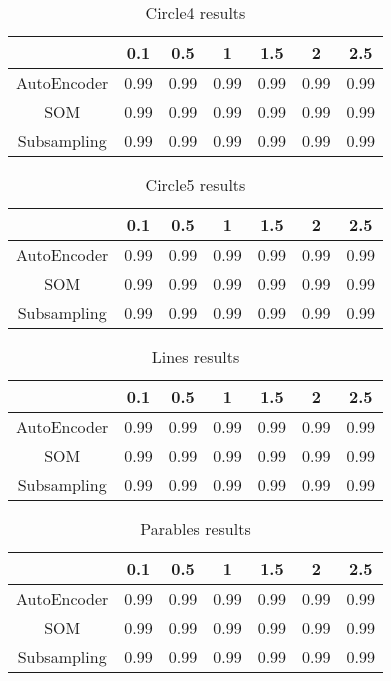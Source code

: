 \begin{table}[h]
    \centering
    \def\arraystretch{1.5}
    \begin{tabular}{|| c | c | c | c | c | c | c ||}
    \hline
         & 0.1 & 0.5 & 1 & 1.5 & 2 & 2.5  \\
    \hline \hline
    AutoEncoder & 0.99 & 0.99 & 0.99 & 0.99 & 0.99 & 0.99 \\ \hline
    SOM & 0.99 & 0.99 & 0.99 & 0.99 & 0.99 & 0.99 \\ \hline
    Subsampling & 0.99 & 0.99 & 0.99 & 0.99 & 0.99 & 0.99 \\ \hline
    \end{tabular}
    \caption{Circle4 results}
    \label{tab:circle4_res}
\end{table}

\begin{table}[h]
    \centering
    \def\arraystretch{1.5}
    \begin{tabular}{|| c | c | c | c | c | c | c ||}
    \hline
         & 0.1 & 0.5 & 1 & 1.5 & 2 & 2.5  \\
    \hline \hline
    AutoEncoder & 0.99 & 0.99 & 0.99 & 0.99 & 0.99 & 0.99 \\ \hline
    SOM & 0.99 & 0.99 & 0.99 & 0.99 & 0.99 & 0.99 \\ \hline
    Subsampling & 0.99 & 0.99 & 0.99 & 0.99 & 0.99 & 0.99 \\ \hline
    \end{tabular}
    \caption{Circle5 results}
    \label{tab:circle5_res}
\end{table}

\begin{table}[h]
    \centering
    \def\arraystretch{1.5}
    \begin{tabular}{|| c | c | c | c | c | c | c ||}
    \hline
         & 0.1 & 0.5 & 1 & 1.5 & 2 & 2.5  \\
    \hline \hline
    AutoEncoder & 0.99 & 0.99 & 0.99 & 0.99 & 0.99 & 0.99 \\ \hline
    SOM & 0.99 & 0.99 & 0.99 & 0.99 & 0.99 & 0.99 \\ \hline
    Subsampling & 0.99 & 0.99 & 0.99 & 0.99 & 0.99 & 0.99 \\ \hline
    \end{tabular}
    \caption{Lines results}
    \label{tab:lines_res}
\end{table}

\begin{table}[h]
    \centering
    \def\arraystretch{1.5}
    \begin{tabular}{|| c | c | c | c | c | c | c ||}
    \hline
         & 0.1 & 0.5 & 1 & 1.5 & 2 & 2.5  \\
    \hline \hline
    AutoEncoder & 0.99 & 0.99 & 0.99 & 0.99 & 0.99 & 0.99 \\ \hline
    SOM & 0.99 & 0.99 & 0.99 & 0.99 & 0.99 & 0.99 \\ \hline
    Subsampling & 0.99 & 0.99 & 0.99 & 0.99 & 0.99 & 0.99 \\ \hline
    \end{tabular}
    \caption{Parables results}
    \label{tab:parables_res}
\end{table}

